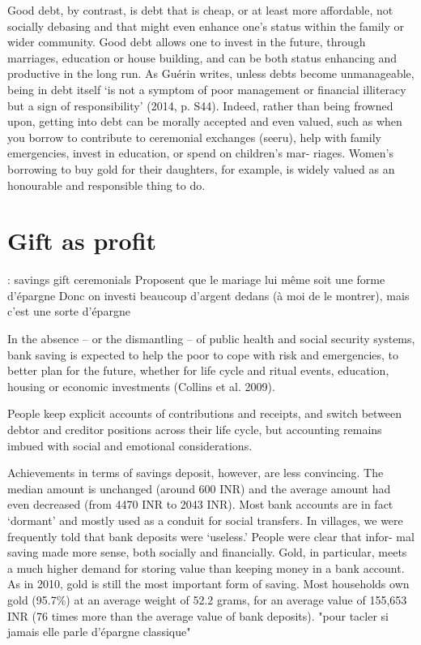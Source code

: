\documentclass[a4paper, 11pt, onecolumn]{article}
\begin{document}
Good debt, by contrast, is debt that is cheap, or at least more affordable, not socially debasing and that
might even enhance one's status within the family or wider community. Good debt allows one to invest in the
future, through marriages, education or house building, and can be both status enhancing and productive in the
long run. As Guérin writes, unless debts become unmanageable, being in debt itself ‘is not a symptom of poor
management or financial illiteracy but a sign of responsibility’ (2014, p. S44). Indeed, rather than being frowned
upon, getting into debt can be morally accepted and even valued, such as when you borrow to contribute to
ceremonial exchanges (seeru), help with family emergencies, invest in education, or spend on children's mar-
riages. Women's borrowing to buy gold for their daughters, for example, is widely valued as an honourable and
responsible thing to do.


\section{Gift as profit}


\cite{Guerin2020c} : savings gift ceremonials
Proposent que le mariage lui même soit une forme d'épargne
Donc on investi beaucoup d'argent dedans (à moi de le montrer), mais c'est une sorte d'épargne

In the absence – or the dismantling – of public health and social security systems, bank saving is
expected to help the poor to cope with risk and emergencies, to better plan for the future, whether for
life cycle and ritual events, education, housing or economic investments (Collins et al. 2009).

People keep explicit accounts of contributions and
receipts, and switch between debtor and creditor positions across their life cycle, but accounting
remains imbued with social and emotional considerations.

Achievements in terms of savings deposit,
however, are less convincing. The median amount is unchanged (around 600 INR) and the average
amount had even decreased (from 4470 INR to 2043 INR). Most bank accounts are in fact ‘dormant’
and mostly used as a conduit for social transfers. 
In villages, we were frequently told that bank deposits were ‘useless.’ People were clear that infor-
mal saving made more sense, both socially and financially. Gold, in particular, meets a much higher
demand for storing value than keeping money in a bank account. As in 2010, gold is still the most
important form of saving. Most households own gold (95.7\%) at an average weight of 52.2 grams, for
an average value of 155,653 INR (76 times more than the average value of bank deposits).
"pour tacler \cite{Anukriti2020} si jamais elle parle d'épargne classique"
\end{document}

